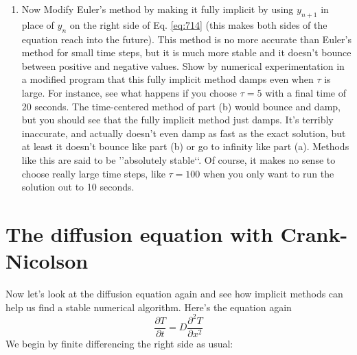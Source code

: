 \begin{problem}
\begin{enumerate}[label=(\alph*)]
\item  Now Modify Euler\rq s method by making it fully implicit by using $y_{n+1}$
in place of $y_n$ on the right side of Eq. \eqref{eq:714} (this makes both sides of
the equation reach into the future). This method is no more accurate
than Euler\rq s method for small time steps, but it is much more stable
and it doesn\rq t bounce between positive and negative values.
Show by numerical experimentation in a modified program that this
fully implicit method damps even when $ \tau $ is large. For instance, see
what happens if you choose $ \tau = 5$ with a final time of 20 seconds. The
time-centered method of part (b) would bounce and damp, but you
should see that the fully implicit method just damps. It\rq s terribly inaccurate, and actually doesn\rq t even damp as fast as the exact solution,
but at least it doesn\rq t bounce like part (b) or go to infinity like part (a).
Methods like this are said to be \rq\rq absolutely stable\lq\lq. Of course, it makes
no sense to choose really large time steps, like $ \tau = 100$ when you only
want to run the solution out to 10 seconds.

\end{enumerate}
\end{problem}
\section*{The diffusion equation with Crank-Nicolson}

Now let\rq s look at the diffusion equation again and see how implicit methods can
help us find a stable numerical algorithm. Here\rq s the equation again
\begin{equation}\label{eq:715}
\frac{\partial T}{\partial t}=D \frac{\partial^{2} T}{\partial x^{2}}
\end{equation}
We begin by finite differencing the right side as usual:

